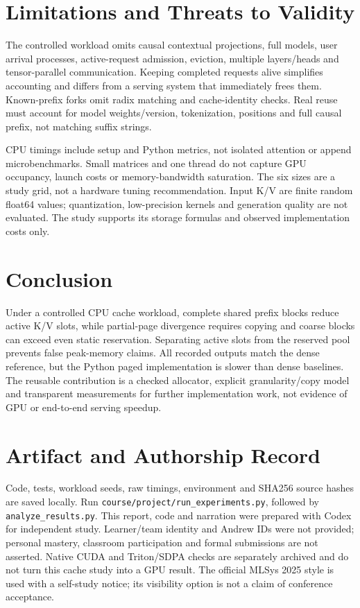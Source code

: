 \documentclass{article}
\begin{document}
\section{Limitations and Threats to Validity}
The controlled workload omits causal contextual projections, full models, user arrival processes, active-request admission, eviction, multiple layers/heads and tensor-parallel communication. Keeping completed requests alive simplifies accounting and differs from a serving system that immediately frees them. Known-prefix forks omit radix matching and cache-identity checks. Real reuse must account for model weights/version, tokenization, positions and full causal prefix, not matching suffix strings.

CPU timings include setup and Python metrics, not isolated attention or append microbenchmarks. Small matrices and one thread do not capture GPU occupancy, launch costs or memory-bandwidth saturation. The six sizes are a study grid, not a hardware tuning recommendation. Input K/V are finite random float64 values; quantization, low-precision kernels and generation quality are not evaluated. The study supports its storage formulas and observed implementation costs only.

\section{Conclusion}
Under a controlled CPU cache workload, complete shared prefix blocks reduce active K/V slots, while partial-page divergence requires copying and coarse blocks can exceed even static reservation. Separating active slots from the reserved pool prevents false peak-memory claims. All recorded outputs match the dense reference, but the Python paged implementation is slower than dense baselines. The reusable contribution is a checked allocator, explicit granularity/copy model and transparent measurements for further implementation work, not evidence of GPU or end-to-end serving speedup.

\section*{Artifact and Authorship Record}
Code, tests, workload seeds, raw timings, environment and SHA256 source hashes are saved locally. Run \texttt{course/project/run\_experiments.py}, followed by \texttt{analyze\_results.py}. This report, code and narration were prepared with Codex for independent study. Learner/team identity and Andrew IDs were not provided; personal mastery, classroom participation and formal submissions are not asserted. Native CUDA and Triton/SDPA checks are separately archived and do not turn this cache study into a GPU result. The official MLSys 2025 style is used with a self-study notice; its visibility option is not a claim of conference acceptance.

\clearpage


\end{document}
